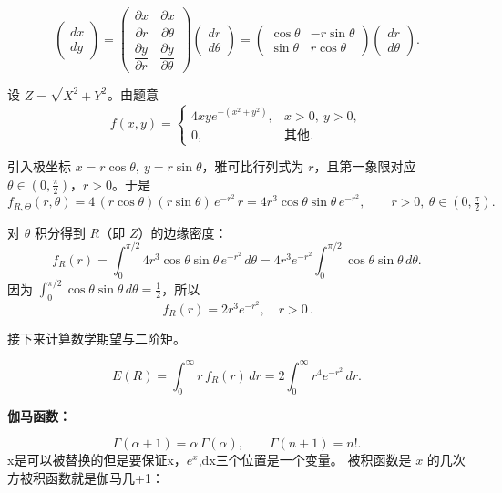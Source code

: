 \begin{solution}
    \begin{note}
        \[
\begin{pmatrix}
dx \\
dy
\end{pmatrix}
=
\begin{pmatrix}
\dfrac{\partial x}{\partial r} & \dfrac{\partial x}{\partial \theta} \\[6pt]
\dfrac{\partial y}{\partial r} & \dfrac{\partial y}{\partial \theta}
\end{pmatrix}
\begin{pmatrix}
dr \\
d\theta
\end{pmatrix}
=
\begin{pmatrix}
\cos\theta & -r\sin\theta \\
\sin\theta & r\cos\theta
\end{pmatrix}
\begin{pmatrix}
dr \\
d\theta
\end{pmatrix}.
\]
    \end{note}
设 $Z=\sqrt{X^2+Y^2}$。由题意
\[
f(x,y)=
\begin{cases}
4xy e^{-(x^2+y^2)}, & x>0,\ y>0,\\[4pt]
0,&\text{其他}.
\end{cases}
\]

引入极坐标 $x=r\cos\theta,\ y=r\sin\theta$，雅可比行列式为 $r$，且第一象限对应 $\theta\in(0,\tfrac{\pi}{2})$，$r>0$。于是
\[
f_{R,\Theta}(r,\theta)
=4\,(r\cos\theta)(r\sin\theta)\,e^{-r^2}\,r
=4 r^3\cos\theta\sin\theta\,e^{-r^2},\qquad r>0,\ \theta\in(0,\tfrac{\pi}{2}).
\]

对 $\theta$ 积分得到 $R$（即 $Z$）的边缘密度：
\[
f_R(r)=\int_0^{\pi/2}4 r^3\cos\theta\sin\theta\,e^{-r^2}\,d\theta
=4 r^3 e^{-r^2}\int_0^{\pi/2}\cos\theta\sin\theta\,d\theta.
\]
因为 $\int_0^{\pi/2}\cos\theta\sin\theta\,d\theta=\tfrac12$，所以
\[
\boxed{\,f_R(r)=2 r^3 e^{-r^2},\quad r>0\,.}
\]

接下来计算数学期望与二阶矩。

\[
E(R)=\int_0^{\infty} r\,f_R(r)\,dr
=2\int_0^{\infty} r^4 e^{-r^2}\,dr.
\]
\begin{definition}
    \textbf{伽马函数：}


\[
\Gamma(\alpha+1)=\alpha\,\Gamma(\alpha),
\qquad 
\Gamma(n+1)=n!.
\]
x是可以被替换的但是要保证x，$e^x$,dx三个位置是一个变量。
被积函数是 $x$ 的几次方被积函数就是伽马几+1：


\end{definition}
\end{solution}
